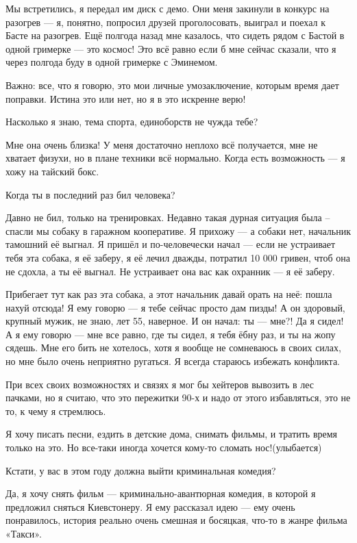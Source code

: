 Мы встретились, я передал им диск с демо. Они меня закинули в конкурс на
разогрев --- я, понятно, попросил друзей проголосовать, выиграл и поехал к Басте
на разогрев. Ещё полгода назад мне казалось, что сидеть рядом с Бастой в одной
гримерке --- это космос! Это всё равно если б мне сейчас сказали, что я через
полгода буду в одной гримерке с Эминемом.

Важно: все, что я говорю, это мои личные умозаключение, которым время дает
поправки. Истина это или нет, но я в это искренне верю!

Насколько я знаю, тема спорта, единоборств не чужда тебе?

Мне она очень близка! У меня  достаточно неплохо всё получается, мне не хватает
физухи, но в плане техники всё нормально. Когда есть возможность --- я хожу на
тайский бокс.

Когда ты в последний раз бил человека?

Давно не бил, только на тренировках. Недавно такая дурная ситуация была –
спасли мы собаку в гаражном кооперативе. Я прихожу --- а собаки нет, начальник
тамошний её выгнал. Я пришёл и по-человечески начал --- если не устраивает тебя
эта собака, я её заберу, я её лечил дважды, потратил 10 000 гривен, чтоб она не
сдохла, а ты её выгнал. Не устраивает она вас как охранник --- я её заберу.

Прибегает тут как раз эта собака, а этот начальник давай орать на неё: пошла
нахуй отсюда! Я ему говорю --- я тебе сейчас просто дам пизды! А он здоровый,
крупный мужик, не знаю, лет 55, наверное. И он начал: ты --- мне?! Да я сидел! А
я ему говорю --- мне все равно, где ты сидел, я тебя ёбну раз, и ты на жопу
сядешь. Мне его бить не хотелось, хотя я вообще не сомневаюсь в своих силах, но
мне было очень неприятно ругаться. Я всегда стараюсь избежать конфликта.

При всех своих возможностях и связях я мог бы хейтеров вывозить в лес пачками,
но я считаю, что это пережитки 90-х и надо от этого избавляться, это не то, к
чему я стремлюсь.

Я хочу писать песни, ездить в детские дома, снимать фильмы, и тратить время
только на это. Но все-таки иногда хочется кому-то сломать нос!(улыбается)

Кстати, у вас в этом году должна выйти криминальная комедия?

Да, я хочу снять фильм --- криминально-авантюрная комедия, в которой я предложил
сняться Киевстонеру. Я ему рассказал идею --- ему очень понравилось, история
реально очень смешная и босяцкая, что-то в жанре фильма «Такси».

